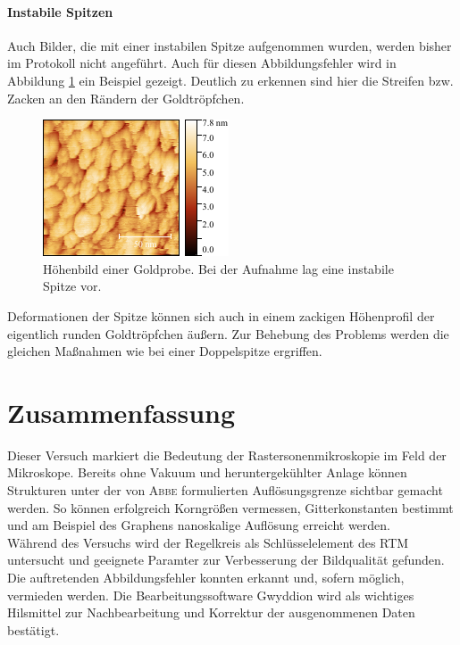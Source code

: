 \documentclass[a4paper,twoside,final]{article}
\begin{document}
\FloatBarrier

\paragraph{Instabile Spitzen}
Auch Bilder, die mit einer instabilen Spitze aufgenommen wurden, werden bisher im Protokoll nicht angeführt. Auch für diesen Abbildungsfehler wird in Abbildung \ref{fig:instabileSpitze} ein Beispiel gezeigt. Deutlich zu erkennen sind hier die Streifen bzw. Zacken an den Rändern der Goldtröpfchen.

\begin{figure}[h]
  \centering
  \includegraphics[height = 4.5 cm] {Bilder/Image02015_BeispielInstabileSpitze.pdf}
  \caption{Höhenbild einer Goldprobe. Bei der Aufnahme lag eine instabile Spitze vor.}
  \label{fig:instabileSpitze}
\end{figure}

Deformationen der Spitze können sich auch in einem zackigen Höhenprofil der eigentlich runden Goldtröpfchen äußern. Zur Behebung des Problems werden die gleichen Maßnahmen wie bei einer Doppelspitze ergriffen.

\FloatBarrier
\newpage
\section{Zusammenfassung}
Dieser Versuch markiert die Bedeutung der Rastersonenmikroskopie im Feld der Mikroskope. Bereits ohne Vakuum und heruntergekühlter Anlage können Strukturen unter der von \textsc{Abbe} formulierten Auflösungsgrenze sichtbar gemacht werden. So können erfolgreich Korngrößen vermessen, Gitterkonstanten bestimmt und am Beispiel des Graphens nanoskalige Auflösung erreicht werden. \\
Während des Versuchs wird der Regelkreis als Schlüsselelement des RTM untersucht und geeignete Paramter zur Verbesserung der Bildqualität gefunden. Die auftretenden Abbildungsfehler konnten erkannt und, sofern möglich, vermieden werden. Die Bearbeitungssoftware Gwyddion wird als wichtiges Hilsmittel zur Nachbearbeitung und Korrektur der ausgenommenen Daten bestätigt.
\end{document}
